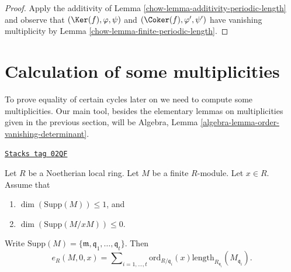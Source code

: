 \begin{proof}

Apply the additivity of Lemma \ref{chow-lemma-additivity-periodic-length}
and observe that $(\Ker(f), \varphi, \psi)$ and
$(\Coker(f), \varphi', \psi')$ have vanishing multiplicity by
Lemma \ref{chow-lemma-finite-periodic-length}.
\end{proof}

\section{Calculation of some multiplicities}
\label{chow-section-calculation}
To prove equality of certain cycles later on we need to
compute some multiplicities. Our main tool, besides the
elementary lemmas on multiplicities given in the previous section,
will be Algebra, Lemma \ref{algebra-lemma-order-vanishing-determinant}.

\begin{lemma}
\label{chow-lemma-length-multiplication}
\href{https://stacks.math.columbia.edu/tag/02QF}{\texttt{Stacks tag 02QF}}

Let $R$ be a Noetherian local ring.
Let $M$ be a finite $R$-module. Let $x \in R$. Assume that
\begin{enumerate}
\item $\dim(\text{Supp}(M)) \leq 1$, and
\item $\dim(\text{Supp}(M/xM)) \leq 0$.
\end{enumerate}
Write
$\text{Supp}(M) = \{\mathfrak m, \mathfrak q_1, \ldots, \mathfrak q_t\}$.
Then
$$
e_R(M, 0, x) =
\sum\nolimits_{i = 1, \ldots, t}
\text{ord}_{R/\mathfrak q_i}(x)
\text{length}_{R_{\mathfrak q_i}}(M_{\mathfrak q_i}).
$$
\end{lemma}

